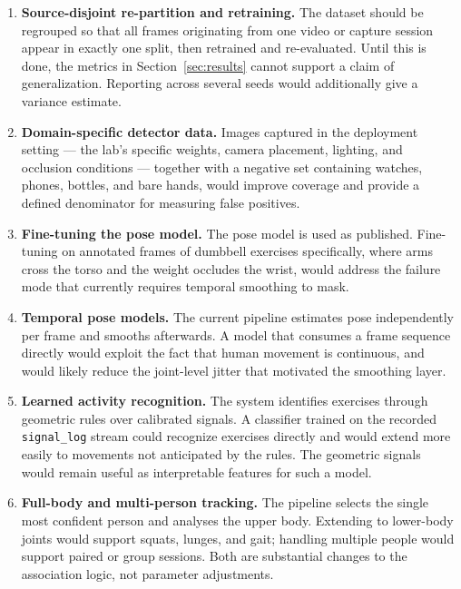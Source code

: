 \documentclass[11pt,a4paper]{article}
\newcommand{\code}[1]{\texttt{\small #1}}
\begin{document}
\begin{enumerate}
\item \textbf{Source-disjoint re-partition and retraining.} The dataset should be
regrouped so that all frames originating from one video or capture session appear
in exactly one split, then retrained and re-evaluated. Until this is done, the
metrics in Section~\ref{sec:results} cannot support a claim of generalization.
Reporting across several seeds would additionally give a variance estimate.

\item \textbf{Domain-specific detector data.} Images captured in the deployment
setting --- the lab's specific weights, camera placement, lighting, and occlusion
conditions --- together with a negative set containing watches, phones, bottles,
and bare hands, would improve coverage and provide a defined denominator for
measuring false positives.

\item \textbf{Fine-tuning the pose model.} The pose model is used as published.
Fine-tuning on annotated frames of dumbbell exercises specifically, where arms
cross the torso and the weight occludes the wrist, would address the failure
mode that currently requires temporal smoothing to mask.

\item \textbf{Temporal pose models.} The current pipeline estimates pose
independently per frame and smooths afterwards. A model that consumes a frame
sequence directly would exploit the fact that human movement is continuous, and
would likely reduce the joint-level jitter that motivated the smoothing layer.

\item \textbf{Learned activity recognition.} The system identifies exercises
through geometric rules over calibrated signals. A classifier trained on the
recorded \code{signal\_log} stream could recognize exercises directly and would
extend more easily to movements not anticipated by the rules. The geometric
signals would remain useful as interpretable features for such a model.

\item \textbf{Full-body and multi-person tracking.} The pipeline selects the
single most confident person and analyses the upper body. Extending to lower-body
joints would support squats, lunges, and gait; handling multiple people would
support paired or group sessions. Both are substantial changes to the association
logic, not parameter adjustments.
\end{enumerate}
\end{document}
